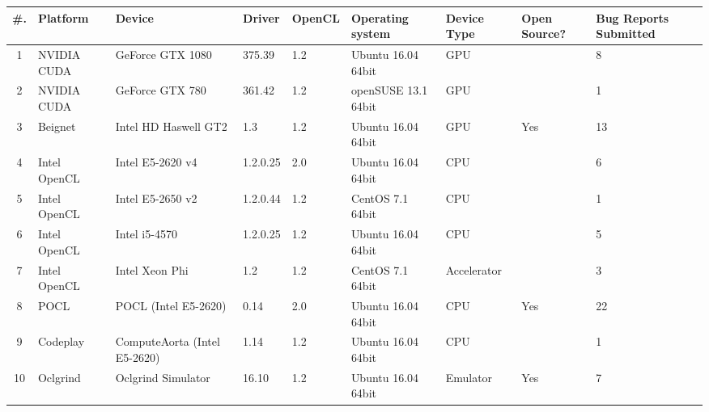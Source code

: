 \begin{tabular}{ cllllllR{1cm} | R{1.6cm} }
\toprule
\textbf{\#. } & \textbf{Platform} & \textbf{Device} & \textbf{Driver} & \textbf{OpenCL} & 
\textbf{Operating system} & \textbf{Device Type} & \textbf{Open Source?} & \textbf{Bug Reports Submitted} \\
 & NVIDIA CUDA & GeForce GTX 1080 & 375.39 & 1.2 & Ubuntu 16.04 64bit & GPU &  & 8 \\
2 & NVIDIA CUDA & GeForce GTX 780 & 361.42 & 1.2 & openSUSE  13.1 64bit & GPU &  &  1 \\
3 & Beignet & Intel HD Haswell GT2 & 1.3 & 1.2 & Ubuntu 16.04 64bit & GPU & Yes &  13 \\
4 & Intel OpenCL & Intel E5-2620 v4 & 1.2.0.25 & 2.0 & Ubuntu 16.04 64bit & CPU &  & 6 \\
5 & Intel OpenCL & Intel E5-2650 v2 & 1.2.0.44 & 1.2 & CentOS 7.1 64bit & CPU &  & 1 \\
6 & Intel OpenCL & Intel i5-4570 & 1.2.0.25 & 1.2 & Ubuntu 16.04 64bit & CPU &  & 5 \\
7 & Intel OpenCL & Intel Xeon Phi & 1.2 & 1.2 & CentOS 7.1 64bit & Accelerator &  & 3 \\
8 & POCL & POCL (Intel E5-2620) & 0.14 & 2.0 & Ubuntu 16.04 64bit & CPU & Yes & 22 \\
9 & Codeplay & ComputeAorta (Intel E5-2620) & 1.14 & 1.2 & Ubuntu 16.04 64bit & CPU &  & 1 \\
10 & Oclgrind & Oclgrind Simulator & 16.10 & 1.2 & Ubuntu 16.04 64bit & Emulator & Yes & 7 \\

\bottomrule
\end{tabular}

